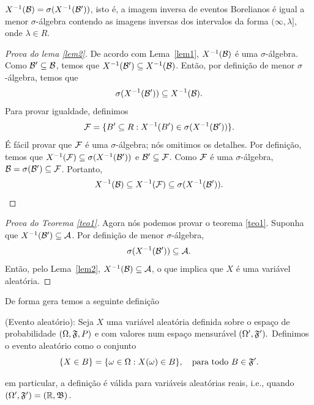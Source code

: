 \begin{frame}

%



\begin{lema} \label{lem2}
$X^{-1}({\cal B})=\sigma(X^{-1}({\cal B}'))$, isto é, a imagem inversa de
eventos Borelianos é igual a menor $\sigma$-álgebra contendo as
imagens inversas dos
intervalos da forma $(\infty,\lambda]$, onde $\lambda\in R$.
\end{lema}

\begin{proof}[Prova do lema \ref{lem2}]
 De acordo com Lema~\ref{lem1}, $X^{-1}({\cal B})$ é uma
$\sigma$-álgebra. Como ${\cal B}'\subseteq {\cal B}$, temos que
$X^{-1}({\cal B}')\subseteq X^{-1}({\cal B})$. Então, por definição de menor
$\sigma$-álgebra, temos que $$\sigma(X^{-1}({\cal B}'))\subseteq
X^{-1}({\cal B}).$$ 
Para provar igualdade, definimos
$${\cal F}=\{B'\subseteq R:X^{-1}(B')\in \sigma(X^{-1}({\cal B}'))\}.$$
É fácil provar que ${\cal F}$ é uma $\sigma$-álgebra; nós omitimos os
detalhes. Por definição, temos que $X^{-1}({\cal F})\subseteq
\sigma(X^{-1}({\cal B}'))$ e ${\cal B}'\subseteq {\cal F}$. Como ${\cal F}$ é uma
$\sigma$-álgebra, ${\cal B}=\sigma({\cal B}')\subseteq {\cal F}$. Portanto,
$$X^{-1}({\cal B})\subseteq X^{-1}({\cal F})\subseteq
\sigma(X^{-1}({\cal B}')).$$	
\end{proof}
\end{frame}
%
\begin{frame}
%
\begin{proof}[Prova do Teorema \ref{teo1}]
Agora nós podemos provar o teorema \ref{teo1}. Suponha que
$X^{-1}({\cal B}')\subseteq {\cal A}$. Por definição de menor $\sigma$-álgebra,
$$\sigma(X^{-1}({\cal B}'))\subseteq {\cal A}.$$ Então, pelo Lema~\ref{lem2},
$X^{-1}({\cal B})\subseteq {\cal A}$, o que implica que $X$ é uma variável
aleatória.
\end{proof}%

De forma gera temos a seguinte definição

\begin{defi}{(Evento aleatório):}
	Seja $X$ uma variável aleatória definida sobre o espaço de probabilidade $(\Omega ,\frak{F} ,P)$ e com valores num espaço mensurável  $(\Omega^\prime ,\frak{F}^\prime).$ Definimos o evento aleatório como o conjunto
	$$\{{X \in B}\} = \{{\omega \in \Omega : X(\omega) \in B }\}, \quad \text{para todo} \ B \in \frak{F}^\prime.$$
\end{defi}
em particular, a definição é válida para variáveis aleatórias reais, i.e., quando 
$ (\Omega^\prime ,\frak{F}^\prime) =\left( \mathbb{R},%
\frak{B}\right).$




\end{frame}


